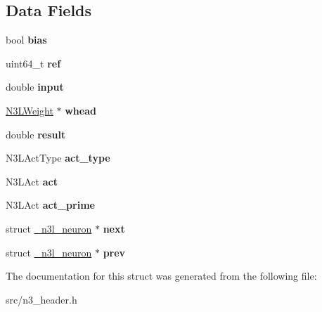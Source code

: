 \subsection*{Data Fields}
\begin{DoxyCompactItemize}
\item 
\mbox{\label{struct__n3l__neuron_a0f3291ff81ab13111e538622ab662069}} 
bool {\bfseries bias}
\item 
\mbox{\label{struct__n3l__neuron_aa0053e003b954df3b58853f003284958}} 
uint64\+\_\+t {\bfseries ref}
\item 
\mbox{\label{struct__n3l__neuron_ac896f5f8bd82c056cc61872120391048}} 
double {\bfseries input}
\item 
\mbox{\label{struct__n3l__neuron_ac9259a513822ea957c03430988adfa6a}} 
\mbox{\hyperlink{struct__n3l__weight}{N3\+L\+Weight}} $\ast$ {\bfseries whead}
\item 
\mbox{\label{struct__n3l__neuron_afc9c38f4676dbe2ead749f8b6c81f491}} 
double {\bfseries result}
\item 
\mbox{\label{struct__n3l__neuron_af424e7accb8d1d089b828a1de69e03a0}} 
N3\+L\+Act\+Type {\bfseries act\+\_\+type}
\item 
\mbox{\label{struct__n3l__neuron_a3ed17ddbe86d42ed6b7d31256b109262}} 
N3\+L\+Act {\bfseries act}
\item 
\mbox{\label{struct__n3l__neuron_a9c9de65191cb097fd7a71752c83fc3db}} 
N3\+L\+Act {\bfseries act\+\_\+prime}
\item 
\mbox{\label{struct__n3l__neuron_a55f1bc3d589d69c5a940d0cb497610c4}} 
struct \mbox{\hyperlink{struct__n3l__neuron}{\+\_\+n3l\+\_\+neuron}} $\ast$ {\bfseries next}
\item 
\mbox{\label{struct__n3l__neuron_a706ad4614fd4d1bd9a824f6ea8c0c9e5}} 
struct \mbox{\hyperlink{struct__n3l__neuron}{\+\_\+n3l\+\_\+neuron}} $\ast$ {\bfseries prev}
\end{DoxyCompactItemize}


The documentation for this struct was generated from the following file\+:\begin{DoxyCompactItemize}
\item 
src/n3\+\_\+header.\+h\end{DoxyCompactItemize}
